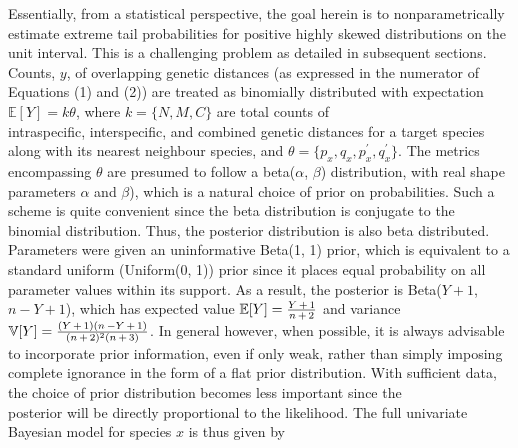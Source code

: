 \documentclass[12pt]{article}
\begin{document}
Essentially, from a statistical perspective, the goal herein is to nonparametrically estimate extreme tail probabilities for positive highly skewed distributions on the unit interval. This is a challenging problem as detailed in subsequent sections.  Counts, $y$, of overlapping genetic distances (as expressed in the numerator of Equations (1) and (2)) are treated as binomially distributed with expectation $\mathbb{E}[Y] = k\theta$, where $k = \{N, M, C\}$ are total counts of \\ intraspecific, interspecific, and combined genetic distances for a target species along with its nearest neighbour species, and $\theta = \{p_x, q_x, p^{'}_x, q^{'}_x\}$. The metrics encompassing $\theta$ are presumed to follow a beta($\alpha$, $\beta$) distribution, with real shape parameters $\alpha$ and $\beta$), which is a natural choice of prior on probabilities. Such a scheme is quite convenient since the beta distribution is conjugate to the binomial distribution. Thus, the posterior distribution is also beta distributed. Parameters were given an uninformative Beta(1, 1) prior, which is equivalent to a standard uniform (Uniform(0, 1)) prior since it places equal probability on all parameter values within its support. As a result, the posterior is Beta($Y + 1$, $n - Y + 1$), which has expected value $\mathbb{E}[Y] = \frac{Y \hspace{0.5mm} + \hspace{0.5mm} 1}{n \hspace{0.5mm} + \hspace{0.5mm} 2}$ and variance $\mathbb{V}[Y] = \frac{(Y \hspace{0.5mm} + \hspace{0.5mm} 1)(n \hspace{0.5mm} - Y \hspace{0.5mm} + \hspace{0.5mm} 1)}{(n \hspace{0.5mm} + \hspace{0.5mm} 2)^2(n \hspace{0.5mm} + \hspace{0.5mm} 3)}$. In general however, when possible, it is always advisable to incorporate prior information, even if only weak, rather than simply imposing complete ignorance in the form of a flat prior distribution. With sufficient data, the choice of prior distribution becomes less important since the \\ posterior will be directly proportional to the likelihood.  The full univariate Bayesian model for species $x$ is thus given by
\end{document}
